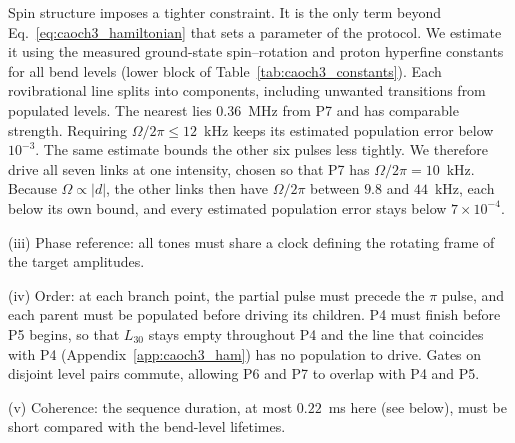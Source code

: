 Spin structure imposes a tighter constraint. It is the only term beyond Eq.~\eqref{eq:caoch3_hamiltonian} that sets a parameter of the protocol. We estimate it using the measured ground-state spin--rotation and proton hyperfine constants~\cite{Namiki1998} for all bend levels (lower block of Table~\ref{tab:caoch3_constants}). Each rovibrational line splits into components, including unwanted transitions from populated levels. The nearest lies $0.36$~MHz from P7 and has comparable strength. Requiring $\Omega/2\pi\le12$~kHz keeps its estimated population error below $10^{-3}$. The same estimate bounds the other six pulses less tightly. We therefore drive all seven links at one intensity, chosen so that P7 has $\Omega/2\pi=10$~kHz. Because $\Omega\propto|d|$, the other links then have $\Omega/2\pi$ between $9.8$ and $44$~kHz, each below its own bound, and every estimated population error stays below $7\times10^{-4}$.

(iii) Phase reference: all tones must share a clock defining the rotating frame of the target amplitudes.

(iv) Order: at each branch point, the partial pulse must precede the $\pi$ pulse, and each parent must be populated before driving its children. P4 must finish before P5 begins, so that $L_{30}$ stays empty throughout P4 and the line that coincides with P4 (Appendix~\ref{app:caoch3_ham}) has no population to drive. Gates on disjoint level pairs commute, allowing P6 and P7 to overlap with P4 and P5.

(v) Coherence: the sequence duration, at most $0.22$~ms here (see below), must be short compared with the bend-level lifetimes.

